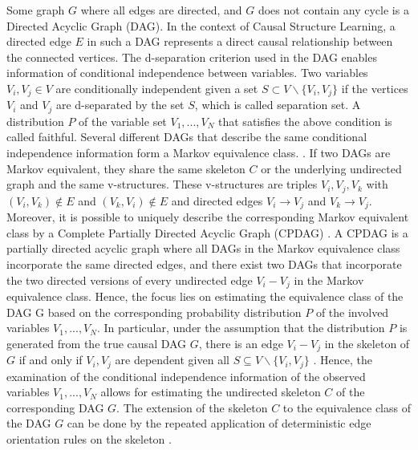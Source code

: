 Some graph $G$ where all edges are directed, and $G$ does not contain any cycle is a Directed Acyclic Graph (DAG). In the context of Causal Structure Learning, a directed edge $E$ in such a DAG represents a direct causal relationship between the connected vertices.
The d-separation criterion used in the DAG enables information of conditional independence between variables. Two variables $V_i, V_j \in V$ are conditionally independent given a set $S \subset V \backslash \{V_i, V_j\}$ if the vertices $V_i$ and $V_j$ are d-separated by the set $S$, which is called separation set.
A distribution $P$ of the variable set $V_1, ..., V_N$ that satisfies the above condition is called faithful.
Several different DAGs that describe the same conditional independence information form a Markov equivalence class. \cite{anderssonCharacterizationMarkovEquivalence1997}. If two DAGs are Markov equivalent, they share the same skeleton $C$ or the underlying undirected graph and the same v-structures.
These v-structures are triples $V_i,V_j,V_k$ with $(V_i,V_k) \notin E$ and $(V_k,V_i) \notin E$ and directed edges $V_i \rightarrow V_j$ and $V_k \rightarrow V_j$. Moreover, it is possible to uniquely describe the corresponding Markov equivalent class by a Complete Partially Directed Acyclic Graph (CPDAG) \cite{chickeringOptimalStructureIdentification2003}.
A CPDAG is a partially directed acyclic graph where all DAGs in the Markov equivalence class incorporate the same directed edges, and there exist two DAGs that incorporate the two directed versions of every undirected edge $V_i - V_j$ in the Markov equivalence class.
Hence, the focus lies on estimating the equivalence class of the DAG G based on the corresponding probability distribution $P$ of the involved variables $V_1,...,V_N$. In particular, under the assumption that the distribution $P$ is generated from the true causal DAG $G$, there is an edge $V_i - V_j$ in the skeleton of $G$ if and only if $V_i,V_j$ are dependent given all $S \subseteq V\backslash \{V_i,V_j\}$ \cite{spirtesCausationPredictionSearch1993}.
Hence, the examination of the conditional independence information of the observed variables $V_1,...,V_N$ allows for estimating the undirected skeleton $C$ of the corresponding DAG $G$. The extension of the skeleton $C$ to the equivalence class of the DAG $G$ can be done by the repeated application of deterministic edge orientation rules on the skeleton \cite{colomboOrderIndependentConstraintBasedCausal,kalischEstimatingHighDimensionalDirected2007,pearlIntroductionCausalInference2010}.


